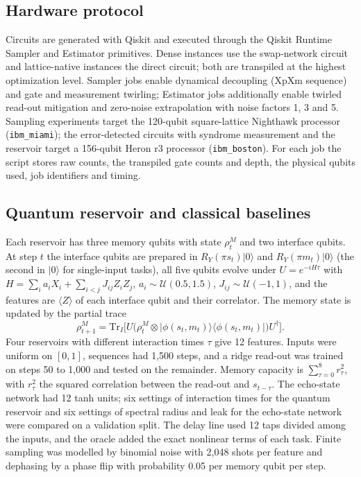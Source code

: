 \subsection*{Hardware protocol}
Circuits are generated with Qiskit\cite{qiskit2024} and executed through the Qiskit Runtime Sampler and Estimator primitives. Dense instances use the swap-network circuit and lattice-native instances the direct circuit; both are transpiled at the highest optimization level. Sampler jobs enable dynamical decoupling (XpXm sequence) and gate and measurement twirling; Estimator jobs additionally enable twirled read-out mitigation and zero-noise extrapolation with noise factors 1, 3 and 5. Sampling experiments target the 120-qubit square-lattice Nighthawk processor (\texttt{ibm\_miami}); the error-detected circuits with syndrome measurement and the reservoir target a 156-qubit Heron r3 processor (\texttt{ibm\_boston}). For each job the script stores raw counts, the transpiled gate counts and depth, the physical qubits used, job identifiers and timing. 

\subsection*{Quantum reservoir and classical baselines}
Each reservoir has three memory qubits with state $\rho^{M}_{t}$ and two interface qubits. At step $t$ the interface qubits are prepared in $R_{Y}(\pi s_{t})\lvert0\rangle$ and $R_{Y}(\pi m_{t})\lvert0\rangle$ (the second in $\lvert0\rangle$ for single-input tasks), all five qubits evolve under $U=e^{-iH\tau}$ with $H=\sum_{i}a_{i}X_{i}+\sum_{i<j}J_{ij}Z_{i}Z_{j}$, $a_{i}\sim\mathcal U(0.5,1.5)$, $J_{ij}\sim\mathcal U(-1,1)$, and the features are $\langle Z\rangle$ of each interface qubit and their correlator. The memory state is updated by the partial trace
\begin{equation}
\rho^{M}_{t+1}=\mathrm{Tr}_{I}\!\big[U\big(\rho^{M}_{t}\otimes\lvert\phi(s_{t},m_{t})\rangle\langle\phi(s_{t},m_{t})\rvert\big)U^{\dagger}\big].
\label{eq:collision}
\end{equation}
Four reservoirs with different interaction times $\tau$ give 12 features. Inputs were uniform on $[0,1]$, sequences had 1,500 steps, and a ridge read-out was trained on steps 50 to 1,000 and tested on the remainder. Memory capacity is $\sum_{\tau=0}^{8}r^{2}_{\tau}$, with $r^{2}_{\tau}$ the squared correlation between the read-out and $s_{t-\tau}$. The echo-state network had 12 tanh units; six settings of interaction times for the quantum reservoir and six settings of spectral radius and leak for the echo-state network were compared on a validation split. The delay line used 12 taps divided among the inputs, and the oracle added the exact nonlinear terms of each task. Finite sampling was modelled by binomial noise with 2,048 shots per feature and dephasing by a phase flip with probability 0.05 per memory qubit per step.

